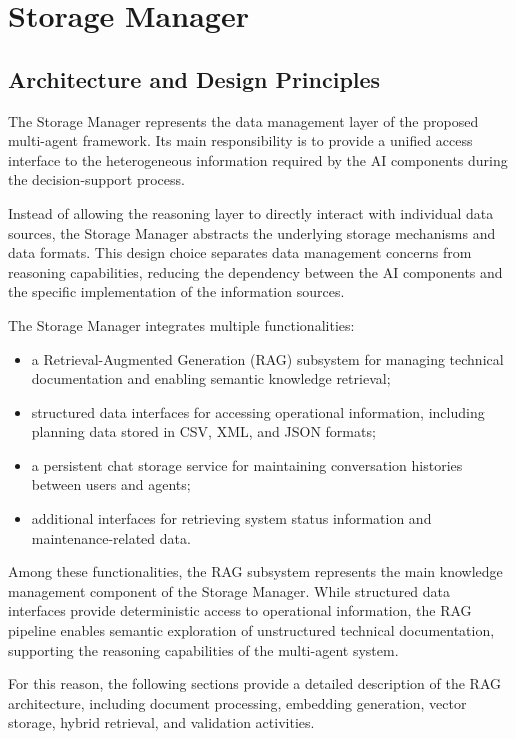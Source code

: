 \section{Storage Manager}

\subsection{Architecture and Design Principles}

The Storage Manager represents the data management layer of the proposed multi-agent framework. Its main responsibility is to provide a unified access interface to the heterogeneous information required by the AI components during the decision-support process.

Instead of allowing the reasoning layer to directly interact with individual data sources, the Storage Manager abstracts the underlying storage mechanisms and data formats. This design choice separates data management concerns from reasoning capabilities, reducing the dependency between the AI components and the specific implementation of the information sources.

The Storage Manager integrates multiple functionalities:

\begin{itemize}
    \item a Retrieval-Augmented Generation (RAG) subsystem for managing technical documentation and enabling semantic knowledge retrieval;
    \item structured data interfaces for accessing operational information, including planning data stored in CSV, XML, and JSON formats;
    \item a persistent chat storage service for maintaining conversation histories between users and agents;
    \item additional interfaces for retrieving system status information and maintenance-related data.
\end{itemize}

Among these functionalities, the RAG subsystem represents the main knowledge management component of the Storage Manager. While structured data interfaces provide deterministic access to operational information, the RAG pipeline enables semantic exploration of unstructured technical documentation, supporting the reasoning capabilities of the multi-agent system.

For this reason, the following sections provide a detailed description of the RAG architecture, including document processing, embedding generation, vector storage, hybrid retrieval, and validation activities.

